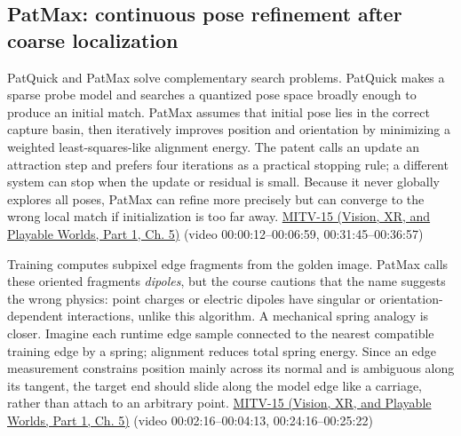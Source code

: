 \subsection{PatMax: continuous pose refinement after coarse localization}\label{04-visual-computing-ii-ch030-patmax-continuous-pose-refinement-after-coarse-localization}

\hypertarget{04-visual-computing-ii-ch030-patmax-continuous-pose-refinement-after-coarse-localization}{}

PatQuick and PatMax solve complementary search problems. PatQuick makes a sparse probe model and searches a quantized pose space broadly enough to produce an initial match. PatMax assumes that initial pose lies in the correct capture basin, then iteratively improves position and orientation by minimizing a weighted least-squares-like alignment energy. The patent calls an update an attraction step and prefers four iterations as a practical stopping rule; a different system can stop when the update or residual is small. Because it never globally explores all poses, PatMax can refine more precisely but can converge to the wrong local match if initialization is too far away. \href{../07-Vision-XR-and-Playable-Worlds-P01/main.pdf\#nameddest=04-visual-computing-ii-ch036-mitv-15---alignment-patmax-distance-field-filtering-and-sub-sampling-us-7065262}{MITV-15 (Vision, XR, and Playable Worlds, Part 1, Ch. 5)} (video 00:00:12--00:06:59, 00:31:45--00:36:57)

Training computes subpixel edge fragments from the golden image. PatMax calls these oriented fragments \emph{dipoles}, but the course cautions that the name suggests the wrong physics: point charges or electric dipoles have singular or orientation-dependent interactions, unlike this algorithm. A mechanical spring analogy is closer. Imagine each runtime edge sample connected to the nearest compatible training edge by a spring; alignment reduces total spring energy. Since an edge measurement constrains position mainly across its normal and is ambiguous along its tangent, the target end should slide along the model edge like a carriage, rather than attach to an arbitrary point. \href{../07-Vision-XR-and-Playable-Worlds-P01/main.pdf\#nameddest=04-visual-computing-ii-ch036-mitv-15---alignment-patmax-distance-field-filtering-and-sub-sampling-us-7065262}{MITV-15 (Vision, XR, and Playable Worlds, Part 1, Ch. 5)} (video 00:02:16--00:04:13, 00:24:16--00:25:22)

